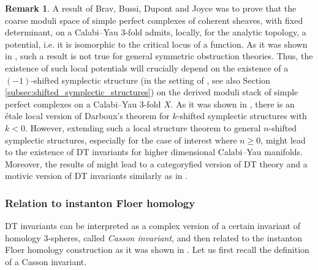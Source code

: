 \documentclass[11pt,colorinlistoftodos]{amsart}
\numberwithin{equation}{subsection}
\theoremstyle{plain}
\theoremstyle{definition}
\newtheorem{rem}[thm]{Remark}
\theoremstyle{remark}
\begin{document}
\begin{rem}
A result of Brav, Bussi, Dupont and Joyce was to prove that the coarse moduli space of simple perfect complexes of coherent sheaves, with fixed determinant, on a Calabi--Yau 3-fold admits, locally, for the analytic topology, a potential, i.e. it is isomorphic to the critical locus of a function. As it was shown in \cite{PandharipandeThomas2014}, such a result is not true for general symmetric obstruction theories. Thus, the existence of such local potentials will crucially depend on the existence of a $(-1)$-shifted symplectic structure (in the setting of \cite{PantevToenVaquieVezzosi2013}, see also Section \ref{subsec:shifted_symplectic_structures}) on the derived moduli stack of simple perfect complexes on a Calabi--Yau 3-fold $X$. As it was shown in \cite{BenBassatBravBussiJoyce2015,BravBussiJoyce2019}, there is an \'etale local version of Darboux's theorem for $k$-shifted symplectic structures with $k<0$. However, extending such a local structure theorem to general $n$-shifted symplectic structures, especially for the case of interest where $n\geq0$, might lead to the existence of DT invariants for higher dimensional Calabi--Yau manifolds. Moreover, the results of \cite{BenBassatBravBussiJoyce2015} might lead to a categoryfied version of DT theory and a motivic version of DT invariants similarly as in \cite{KontsevichSoibelman2008_2}.
\end{rem}


\subsubsection{Relation to instanton Floer homology}
DT invariants can be interpreted as a complex version of a certain invariant of homology 3-spheres, called \emph{Casson invariant}, and then related to the instanton Floer homology construction as it was shown in \cite{Taubes1990}. Let us first recall the definition of a Casson invariant.
\end{document}
